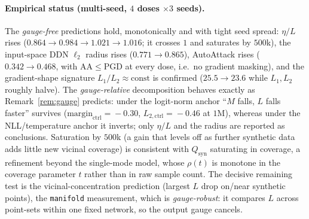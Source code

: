 \documentclass[11pt]{article}
\theoremstyle{definition}
\begin{document}
\paragraph{Empirical status (multi-seed, $4$ doses $\times 3$ seeds).} The \emph{gauge-free} predictions hold,
monotonically and with tight seed spread: $\eta/L$ rises ($0.864\to0.984\to1.021\to1.016$; it crosses $1$ and
saturates by $500$k), the input-space DDN $\ell_2$ radius rises ($0.771\to0.865$), AutoAttack rises
($0.342\to0.468$, with $\mathrm{AA}\le\mathrm{PGD}$ at every dose, i.e.\ no gradient masking), and the
gradient-shape signature $L_1/L_2\approx\text{const}$ is confirmed ($25.5\to23.6$ while $L_1,L_2$ roughly
halve). The \emph{gauge-relative} decomposition behaves exactly as Remark~\ref{rem:gauge} predicts: under the
logit-norm anchor ``$M$ falls, $L$ falls faster'' survives ($\text{margin}_{\mathrm{ctrl}}\!=\!-0.30$,
$L_{2,\mathrm{ctrl}}\!=\!-0.46$ at $1$M), whereas under the NLL/temperature anchor it inverts; only $\eta/L$ and
the radius are reported as conclusions. Saturation by $500$k (a gain that levels off as further synthetic data
adds little new vicinal coverage) is consistent with $Q_{\mathrm{syn}}$ saturating in coverage, a refinement
beyond the single-mode model, whose $\rho(t)$ is monotone in the coverage parameter $t$ rather than in raw
sample count. The decisive remaining test is the vicinal-concentration prediction (largest $L$ drop on/near
synthetic points), the \texttt{manifold} measurement, which is \emph{gauge-robust}: it compares $L$ across
point-sets within one fixed network, so the output gauge cancels.
\end{document}
